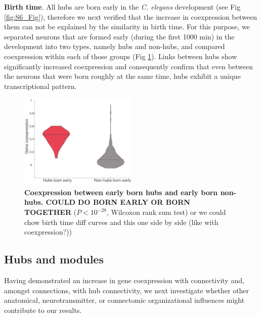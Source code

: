 \documentclass[10pt,letterpaper]{article}
\begin{document}
\textbf{Birth time}. 
All hubs are born early in the \textit{C. elegans} development \cite{Varier2011} (see Fig \ref{fig:S6_Fig}), therefore we next verified that the increase in coexpression between them can not be explained by the similarity in birth time. 
For this purpose, we separated neurons that are formed early (during the first 1000 min) in the development into two types, namely hubs and non-hubs, and compared coexpression within each of those groups (Fig \ref{fig:BirthTimeHubs}). 
Links between hubs show significantly increased coexpression and consequently confirm that even between the neurons that were born roughly at the same time, hubs exhibit a unique transcriptional pattern.
\begin{figure}[t]
  \centering
    \includegraphics[width=0.5\textwidth]{BirthTimeHubs.pdf}
 \caption{\textbf{Coexpression between early born hubs and early born non-hubs. COULD DO BORN EARLY OR BORN TOGETHER} ($P < 10^{-28}$, Wilcoxon rank sum test) or we could chow birth time diff curves and this one side by side (like with coexpression?))
}
\label{fig:BirthTimeHubs}
\end{figure}


\subsection*{Hubs and modules}
Having demonstrated an increase in gene coexpression with connectivity and, amongst connections, with hub connectivity, we next investigate whether other anatomical, neurotransmitter, or connectomic organizational influences might contribute to our results.

\end{document}
